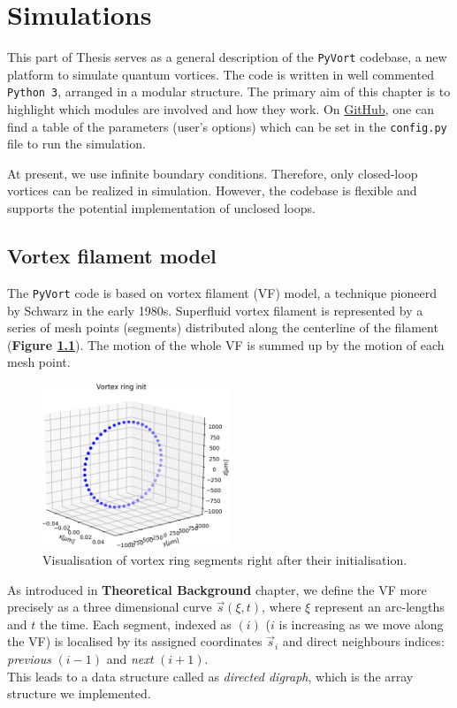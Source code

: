 \chapter{Simulations}

This part of Thesis serves as a general description of the \texttt{PyVort} codebase, a new platform to simulate quantum vortices. The code is written in well commented \texttt{Python 3}, arranged in a modular structure. The primary aim of this chapter is to highlight which modules are involved and how they work.
On \href{https://github.com/KuboBahyl/superfluid}{GitHub}, one can find a table of the parameters (user's options) which can be set in the \texttt{config.py} file to run the simulation.

At present, we use infinite boundary conditions. Therefore, only closed-loop vortices can be realized in simulation. However, the codebase is flexible and supports the potential implementation of unclosed loops.

\section{Vortex filament model}

The \texttt{PyVort} code is based on vortex filament (VF) model, a technique pioneerd by Schwarz \cite{schwarz} in the early 1980s. Superfluid vortex filament is represented by a series of mesh points (segments) distributed along the centerline of the filament (\textbf{Figure \ref{example_ring}}). The motion of the whole VF is summed up by the motion of each mesh point.

\begin{figure}[h]
	\centering
	\includegraphics[width=0.5\textwidth]{graphics/simul/ring_init_crop}
	\caption{Visualisation of vortex ring segments right
after their initialisation.}
	\label{example_ring}
\end{figure}

As introduced in \textbf{Theoretical Background} chapter, we define the VF more precisely as a three dimensional curve $\vec{s}(\xi, t)$, where $\xi$ represent an arc-lengths and $t$ the time.
Each segment, indexed as $(i)$ ($i$ is increasing as we move along the VF) is localised by its assigned coordinates $\vec{s}_i$ and direct neighbours indices: \textit{previous} $(i-1)$ and \textit{next} $(i+1)$.\\
This leads to a data structure called as \textit{directed digraph}, which is the array structure we implemented.

